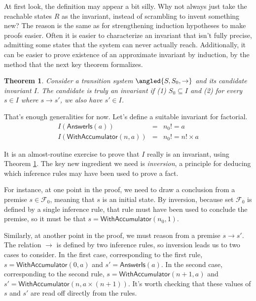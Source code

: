 \documentclass{amsbook}
\newtheorem{theorem}{Theorem}[chapter]
\theoremstyle{definition}
\theoremstyle{remark}
\numberwithin{section}{chapter}
\numberwithin{equation}{chapter}
\begin{document}
At first look, the definition may appear a bit silly.
Why not always just take the reachable states $R$ as the invariant, instead of scrambling to invent something new?
The reason is the same as for strengthening induction hypotheses to make proofs easier.
Often it is easier to characterize an invariant that isn't fully precise, admitting some states that the system can never actually reach.
Additionally, it can be easier to prove existence of an approximate invariant by induction, by the method that the next key theorem formalizes.

\begin{theorem}\label{invariant_induction}
  Consider a transition system $\angled{S, S_0, \to}$ and its candidate invariant $I$.  The candidate is truly an invariant if (1) $S_0 \subseteq I$ and (2) for every $s \in I$ where $s \to s'$, we also have $s' \in I$.
\end{theorem}

That's enough generalities for now.
Let's define a suitable invariant for factorial.
\invariants
\begin{eqnarray*}
  I(\mathsf{AnswerIs}(a)) &=& n_0! = a \\
  I(\mathsf{WithAccumulator}(n, a)) &=& n_0! = n! \times a
\end{eqnarray*}

It is an almost-routine exercise to prove that $I$ really is an invariant, using Theorem \ref{invariant_induction}.
The key new ingredient we need is \emph{inversion}, a principle for deducing which inference rules may have been used to prove a fact.

For instance, at one point in the proof, we need to draw a conclusion from a premise $s \in \mathcal F_0$, meaning that $s$ is an initial state.
By inversion, because set $\mathcal F_0$ is defined by a single inference rule, that rule must have been used to conclude the premise, so it must be that $s = \mathsf{WithAccumulator}(n_0, 1)$.

Similarly, at another point in the proof, we must reason from a premise $s \to s'$.
The relation $\to$ is defined by two inference rules, so inversion leads us to two cases to consider.
In the first case, corresponding to the first rule, $s = \mathsf{WithAccumulator}(0, a)$ and $s' = \mathsf{AnswerIs}(a)$.
In the second case, corresponding to the second rule, $s = \mathsf{WithAccumulator}(n+1, a)$ and $s' = \mathsf{WithAccumulator}(n, a \times (n+1))$.
It's worth checking that these values of $s$ and $s'$ are read off directly from the rules.
\end{document}
